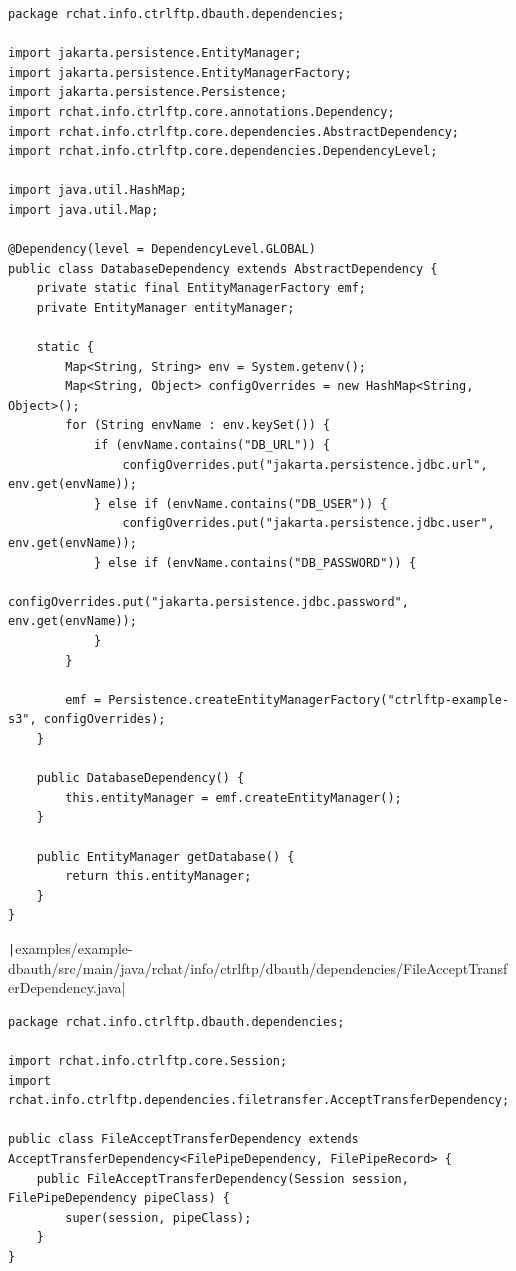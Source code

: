 \documentclass[a4paper,14pt]{extarticle}
\begin{document}
\begin{verbatim}
package rchat.info.ctrlftp.dbauth.dependencies;

import jakarta.persistence.EntityManager;
import jakarta.persistence.EntityManagerFactory;
import jakarta.persistence.Persistence;
import rchat.info.ctrlftp.core.annotations.Dependency;
import rchat.info.ctrlftp.core.dependencies.AbstractDependency;
import rchat.info.ctrlftp.core.dependencies.DependencyLevel;

import java.util.HashMap;
import java.util.Map;

@Dependency(level = DependencyLevel.GLOBAL)
public class DatabaseDependency extends AbstractDependency {
    private static final EntityManagerFactory emf;
    private EntityManager entityManager;

    static {
        Map<String, String> env = System.getenv();
        Map<String, Object> configOverrides = new HashMap<String, Object>();
        for (String envName : env.keySet()) {
            if (envName.contains("DB_URL")) {
                configOverrides.put("jakarta.persistence.jdbc.url", env.get(envName));
            } else if (envName.contains("DB_USER")) {
                configOverrides.put("jakarta.persistence.jdbc.user", env.get(envName));
            } else if (envName.contains("DB_PASSWORD")) {
                configOverrides.put("jakarta.persistence.jdbc.password", env.get(envName));
            }
        }

        emf = Persistence.createEntityManagerFactory("ctrlftp-example-s3", configOverrides);
    }

    public DatabaseDependency() {
        this.entityManager = emf.createEntityManager();
    }

    public EntityManager getDatabase() {
        return this.entityManager;
    }
}
\end{verbatim}
\texttt|examples/example-dbauth/src/main/java/rchat/info/ctrlftp/dbauth/dependencies/FileAcceptTransferDependency.java|
\begin{verbatim}
package rchat.info.ctrlftp.dbauth.dependencies;

import rchat.info.ctrlftp.core.Session;
import rchat.info.ctrlftp.dependencies.filetransfer.AcceptTransferDependency;

public class FileAcceptTransferDependency extends AcceptTransferDependency<FilePipeDependency, FilePipeRecord> {
    public FileAcceptTransferDependency(Session session, FilePipeDependency pipeClass) {
        super(session, pipeClass);
    }
}
\end{verbatim}
\end{document}
